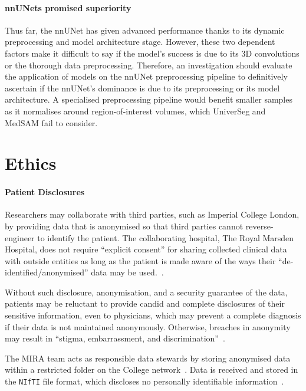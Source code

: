 \documentclass[11pt,twoside]{report}
\begin{document}
\subsubsection{nnUNets promised superiority}

Thus far, the nnUNet has given advanced performance thanks to its dynamic preprocessing and model architecture stage. However, these two dependent factors make it difficult to say if the model's success is due to its 3D convolutions or the thorough data preprocessing. Therefore, an investigation should evaluate the application of models on the nnUNet preprocessing pipeline to definitively ascertain if the nnUNet's dominance is due to its preprocessing or its model architecture. A specialised preprocessing pipeline would benefit smaller samples as it normalises around region-of-interest volumes, which UniverSeg and MedSAM fail to consider.

\chapter{Ethics}

\subsubsection{Patient Disclosures}

Researchers may collaborate with third parties, such as Imperial College London, by providing data that is anonymised so that third parties cannot reverse-engineer to identify the patient. The collaborating hospital, The Royal Marsden Hospital, does not require ``explicit consent'' for sharing collected clinical data with outside entities as long as the patient is made aware of the ways their ``de-identified/anonymised'' data may be used.~\cite{royal-marsden-privacy-note}. 

Without such disclosure, anonymisation, and a security guarantee of the data, patients may be reluctant to provide candid and complete disclosures of their sensitive information, even to physicians, which may prevent a complete diagnosis if their data is not maintained anonymously. Otherwise, breaches in anonymity may result in ``stigma, embarrassment, and discrimination''~\cite{health-privacy}.

The MIRA team acts as responsible data stewards by storing anonymised data within a restricted folder on the College network~\cite{Larson2020-ib}. Data is received and stored in the \texttt{NIfTI} file format, which discloses no personally identifiable information~\cite{gov-gdpr}.
\end{document}
